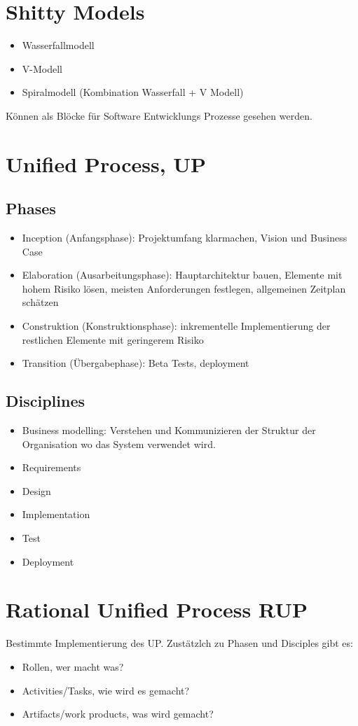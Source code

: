 \section{Shitty Models}
\begin{itemize}
    \item Wasserfallmodell
    \item V-Modell
    \item Spiralmodell (Kombination Wasserfall + V Modell)
\end{itemize}
Können als Blöcke für Software Entwicklungs Prozesse gesehen werden.

\section{Unified Process, UP}
\subsection{Phases}
\begin{itemize}
    \item Inception (Anfangsphase): Projektumfang klarmachen, Vision und Business
    Case
    \item Elaboration (Ausarbeitungsphase): Hauptarchitektur bauen, Elemente mit
    hohem Risiko lösen, meisten Anforderungen festlegen, allgemeinen Zeitplan
    schätzen
    \item Construktion (Konstruktionsphase): inkrementelle Implementierung der
    restlichen Elemente mit geringerem Risiko
    \item Transition (Übergabephase): Beta Tests, deployment
\end{itemize}
\subsection{Disciplines}
\begin{itemize}
    \item Business modelling: Verstehen und Kommunizieren der Struktur der Organisation
    wo das System verwendet wird.
    \item Requirements
    \item Design
    \item Implementation
    \item Test
    \item Deployment
\end{itemize}
\section{Rational Unified Process RUP}
Bestimmte Implementierung des UP. Zustätzlch zu Phasen und Disciples gibt es:
\begin{itemize}
    \item Rollen, wer macht was?
    \item Activities/Tasks, wie wird es gemacht?
    \item Artifacts/work products, was wird gemacht?
\end{itemize}

